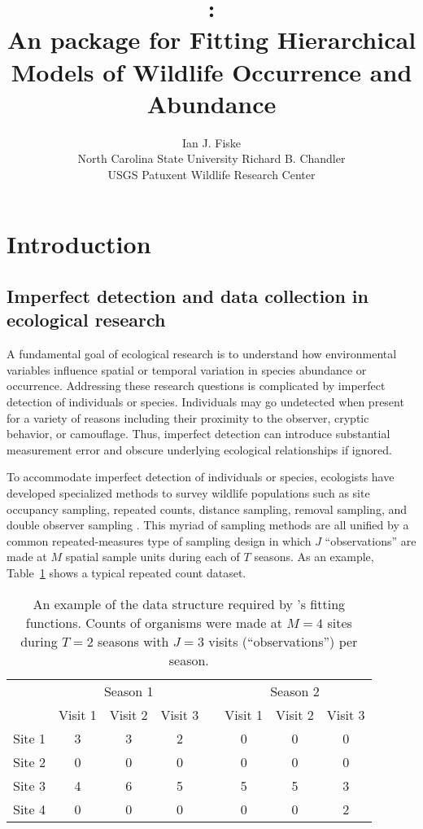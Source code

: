 \documentclass[article,shortnames]{jss}
\author{Ian J. Fiske\\North Carolina State University \And
  Richard B. Chandler\\ USGS Patuxent Wildlife Research Center}
\title{\pkg{unmarked}:\\
  An \proglang{R} package for Fitting Hierarchical Models of
  Wildlife Occurrence and Abundance}
\newcommand{\um}{\pkg{unmarked}}
\begin{document}
\section{Introduction}


\subsection{Imperfect detection and data collection in ecological research}

A fundamental goal of ecological research is to understand how environmental
variables influence spatial or temporal variation in species abundance or
occurrence.  Addressing these research questions is complicated by imperfect
detection of individuals or species.  Individuals may go
undetected when present for a variety of reasons including their proximity to
the observer, cryptic behavior, or camouflage. Thus, imperfect detection
can introduce substantial measurement error and obscure underlying
ecological relationships if ignored.

To accommodate imperfect detection of individuals or species,
ecologists have developed specialized methods to survey wildlife
populations such as site occupancy sampling, repeated counts,
distance sampling, removal sampling, and double observer sampling
\citetext{see Section~\ref{sec:models-impl-unmark} and
\citet{WilliamsEA2002} for definitions}.  This myriad of sampling methods
are all unified by a common repeated-measures type of sampling design in
which $J$ ``observations'' are made at $M$ spatial sample units during each of
$T$ seasons. As an example, Table~\ref{tab:exdata} shows a typical
repeated count dataset.

\begin{table}[h] %
\begin{centering}
\begin{tabular}{lccccccc}
\hline
& \multicolumn{3}{c}{Season 1} && \multicolumn{3}{c}{Season 2} \\
\cline{2-4} \cline{6-8}
        & Visit 1 & Visit 2 & Visit 3 && Visit 1 & Visit 2 & Visit 3 \\
\hline
Site 1  & 3       & 3       & 2       && 0       & 0       & 0 \\
Site 2  & 0       & 0       & 0       && 0       & 0       & 0 \\
Site 3  & 4       & 6       & 5       && 5       & 5       & 3 \\
Site 4  & 0       & 0       & 0       && 0       & 0       & 2 \\
\hline
\end{tabular}
\caption{An example of the data structure required by \um's fitting functions.
Counts of organisms were made at $M=4$ sites during $T=2$ seasons with $J=3$
visits (``observations'') per season.}
\end{centering}
\label{tab:exdata}
\end{table}
\end{document}
